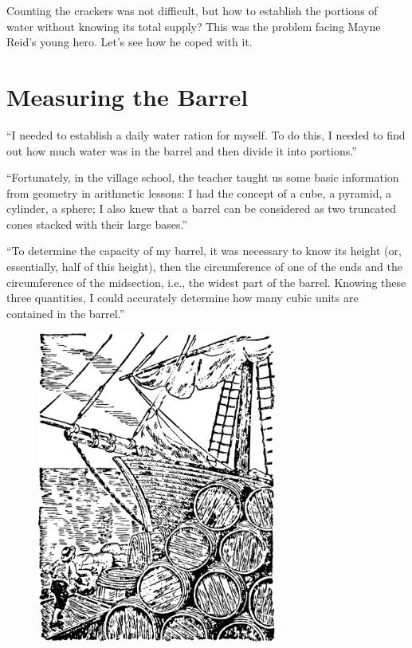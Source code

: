 Counting the crackers was not difficult, but how to establish the portions of water without knowing its total supply? This was the problem facing Mayne Reid's young hero. Let's see how he coped with it.

\section{Measuring the Barrel}
\label{sec-8.2}

``I needed to establish a daily water ration for myself. To do this, I needed to find out how much water was in the barrel and then divide it into portions.''


``Fortunately, in the village school, the teacher taught us some basic information from geometry in arithmetic lessons: I had the concept of a cube, a pyramid, a cylinder, a sphere; I also knew that a barrel can be considered as two truncated cones stacked with their large bases.''

``To determine the capacity of my barrel, it was necessary to know its height (or, essentially, half of this height), then the circumference of one of the ends and the circumference of the midsection, i.e., the widest part of the barrel. Knowing these three quantities, I could accurately determine how many cubic units are contained in the barrel.''

\begin{figure}[h!]
\centering
\includegraphics[width=0.7\textwidth]{figures/ch-08/fig-108.pdf}
\end{figure}


